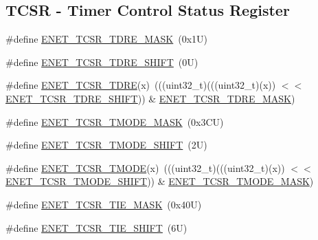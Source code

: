 \subsection*{T\+C\+SR -\/ Timer Control Status Register}
\begin{DoxyCompactItemize}
\item 
\#define \mbox{\hyperlink{group___e_n_e_t___register___masks_ga37a12f7e1bfb1e1c0a09b6664d09cde8}{E\+N\+E\+T\+\_\+\+T\+C\+S\+R\+\_\+\+T\+D\+R\+E\+\_\+\+M\+A\+SK}}~(0x1\+U)
\item 
\#define \mbox{\hyperlink{group___e_n_e_t___register___masks_ga82b3d1ee96813bba32fb72ae120d7047}{E\+N\+E\+T\+\_\+\+T\+C\+S\+R\+\_\+\+T\+D\+R\+E\+\_\+\+S\+H\+I\+FT}}~(0\+U)
\item 
\#define \mbox{\hyperlink{group___e_n_e_t___register___masks_gae9d2cbcc587d22532aedd77745016d92}{E\+N\+E\+T\+\_\+\+T\+C\+S\+R\+\_\+\+T\+D\+RE}}(x)~(((uint32\+\_\+t)(((uint32\+\_\+t)(x)) $<$$<$ \mbox{\hyperlink{group___e_n_e_t___register___masks_ga82b3d1ee96813bba32fb72ae120d7047}{E\+N\+E\+T\+\_\+\+T\+C\+S\+R\+\_\+\+T\+D\+R\+E\+\_\+\+S\+H\+I\+FT}})) \& \mbox{\hyperlink{group___e_n_e_t___register___masks_ga37a12f7e1bfb1e1c0a09b6664d09cde8}{E\+N\+E\+T\+\_\+\+T\+C\+S\+R\+\_\+\+T\+D\+R\+E\+\_\+\+M\+A\+SK}})
\item 
\#define \mbox{\hyperlink{group___e_n_e_t___register___masks_gacd9d9ec96fb7eb23ef9b22525d632424}{E\+N\+E\+T\+\_\+\+T\+C\+S\+R\+\_\+\+T\+M\+O\+D\+E\+\_\+\+M\+A\+SK}}~(0x3\+C\+U)
\item 
\#define \mbox{\hyperlink{group___e_n_e_t___register___masks_gaf43c487f5c76a9af36293da5b3360865}{E\+N\+E\+T\+\_\+\+T\+C\+S\+R\+\_\+\+T\+M\+O\+D\+E\+\_\+\+S\+H\+I\+FT}}~(2\+U)
\item 
\#define \mbox{\hyperlink{group___e_n_e_t___register___masks_ga3d37a6772d89ad0e435b06bae3ec125d}{E\+N\+E\+T\+\_\+\+T\+C\+S\+R\+\_\+\+T\+M\+O\+DE}}(x)~(((uint32\+\_\+t)(((uint32\+\_\+t)(x)) $<$$<$ \mbox{\hyperlink{group___e_n_e_t___register___masks_gaf43c487f5c76a9af36293da5b3360865}{E\+N\+E\+T\+\_\+\+T\+C\+S\+R\+\_\+\+T\+M\+O\+D\+E\+\_\+\+S\+H\+I\+FT}})) \& \mbox{\hyperlink{group___e_n_e_t___register___masks_gacd9d9ec96fb7eb23ef9b22525d632424}{E\+N\+E\+T\+\_\+\+T\+C\+S\+R\+\_\+\+T\+M\+O\+D\+E\+\_\+\+M\+A\+SK}})
\item 
\#define \mbox{\hyperlink{group___e_n_e_t___register___masks_ga1a36ae4a9731e381fa9159387670143f}{E\+N\+E\+T\+\_\+\+T\+C\+S\+R\+\_\+\+T\+I\+E\+\_\+\+M\+A\+SK}}~(0x40\+U)
\item 
\#define \mbox{\hyperlink{group___e_n_e_t___register___masks_ga35fcee5f4e7c9e5b69af4039ee4fa537}{E\+N\+E\+T\+\_\+\+T\+C\+S\+R\+\_\+\+T\+I\+E\+\_\+\+S\+H\+I\+FT}}~(6\+U)

\end{DoxyCompactItemize}
